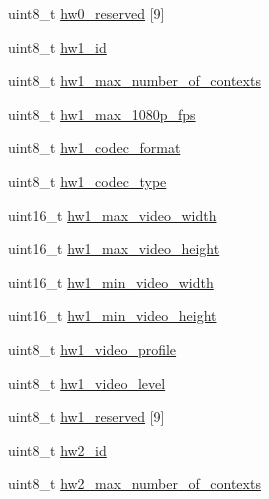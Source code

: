 \begin{DoxyCompactItemize}
\item 
uint8\+\_\+t \mbox{\hyperlink{struct__ni__nvme__identify_a443b1b30b03c2f1e8e56220b81122154}{hw0\+\_\+reserved}} \mbox{[}9\mbox{]}
\item 
uint8\+\_\+t \mbox{\hyperlink{struct__ni__nvme__identify_a1b556f076f91eaf95fdab8265794ebbc}{hw1\+\_\+id}}
\item 
uint8\+\_\+t \mbox{\hyperlink{struct__ni__nvme__identify_a3cc32f515ac9afba8caf0ad66a82b1b2}{hw1\+\_\+max\+\_\+number\+\_\+of\+\_\+contexts}}
\item 
uint8\+\_\+t \mbox{\hyperlink{struct__ni__nvme__identify_a9450eb2dd9729f09cdc07d89370777f3}{hw1\+\_\+max\+\_\+1080p\+\_\+fps}}
\item 
uint8\+\_\+t \mbox{\hyperlink{struct__ni__nvme__identify_a7c5a0902cf215a5048bb3735708ceb9d}{hw1\+\_\+codec\+\_\+format}}
\item 
uint8\+\_\+t \mbox{\hyperlink{struct__ni__nvme__identify_a25869befa2fe0df8c09546235d23be83}{hw1\+\_\+codec\+\_\+type}}
\item 
uint16\+\_\+t \mbox{\hyperlink{struct__ni__nvme__identify_a073a04f6d636c0c9f9d8eb6d3e901a0c}{hw1\+\_\+max\+\_\+video\+\_\+width}}
\item 
uint16\+\_\+t \mbox{\hyperlink{struct__ni__nvme__identify_a69a57cd704e9a75cc89636857dabeb28}{hw1\+\_\+max\+\_\+video\+\_\+height}}
\item 
uint16\+\_\+t \mbox{\hyperlink{struct__ni__nvme__identify_a3e6bc899daf14e9ea5d5a5372b95e853}{hw1\+\_\+min\+\_\+video\+\_\+width}}
\item 
uint16\+\_\+t \mbox{\hyperlink{struct__ni__nvme__identify_ac83eeb9e6e6c251b6eab4bf2665c2fe4}{hw1\+\_\+min\+\_\+video\+\_\+height}}
\item 
uint8\+\_\+t \mbox{\hyperlink{struct__ni__nvme__identify_af5ee7f85e69350091467a05ecd527999}{hw1\+\_\+video\+\_\+profile}}
\item 
uint8\+\_\+t \mbox{\hyperlink{struct__ni__nvme__identify_a38b80c5ff1d65e0cffa394fc1b9cb448}{hw1\+\_\+video\+\_\+level}}
\item 
uint8\+\_\+t \mbox{\hyperlink{struct__ni__nvme__identify_a1179da38ae45bd7e77976a27011f66b9}{hw1\+\_\+reserved}} \mbox{[}9\mbox{]}
\item 
uint8\+\_\+t \mbox{\hyperlink{struct__ni__nvme__identify_a401a301cefba48061a8e0782d002e27f}{hw2\+\_\+id}}
\item 
uint8\+\_\+t \mbox{\hyperlink{struct__ni__nvme__identify_afdeb4d8c27adbe8d1e12ce027b32653f}{hw2\+\_\+max\+\_\+number\+\_\+of\+\_\+contexts}}
\item 

\end{DoxyCompactItemize}

